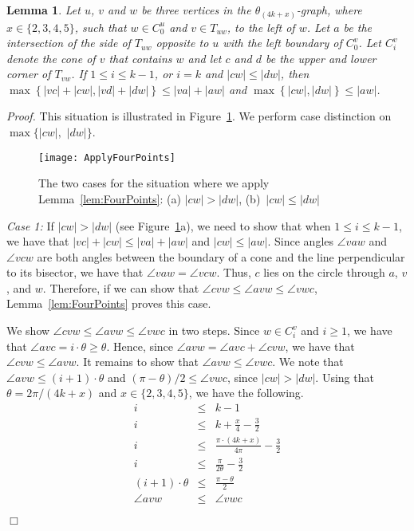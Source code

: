 \documentclass[12pt]{article}
\newtheorem{lem}[defin]{Lemma}
\newenvironment{lemma}{\begin{lem} \sl}{\end{lem}}
\newenvironment{proof}{\emph{Proof.}}{\hfill $\Box$\\}
\newcommand{\graph}[1]{\ensuremath{\theta_{(4 k + #1)}}-graph\xspace}
\newcommand{\canon}[2]{\ensuremath{T_{#1 #2}}}
\begin{document}
\begin{lemma}
  \label{lem:ApplyFourPoints} 
  Let $u$, $v$ and $w$ be three vertices in the \graph{x}, where $x \in \{2, 3, 4, 5\}$, such that $w \in C_0^u$ and $v \in \canon{u}{w}$, to the left of $w$. Let $a$ be the intersection of the side of $\canon{u}{w}$ opposite to $u$ with the left boundary of $C_0^v$. Let $C_i^v$ denote the cone of $v$ that contains $w$ and let $c$ and $d$ be the upper and lower corner of $\canon{v}{w}$. If $1 \leq i \leq k-1$, or $i = k$ and $|c w| \leq |d w|$, then $\max \left\{|v c| + |c w|, |v d| + |d w|\right\} \leq |v a| + |a w|$ and $\max \left\{|c w|, |d w|\right\} \leq |a w|$.
\end{lemma}
\begin{proof}
  This situation is illustrated in Figure~\ref{fig:ApplyFourPoints}. We perform case distinction on $\max \{|c w|,$ $|d w|\}$. 

  \begin{figure}[ht]
    \begin{center}
      \texttt{[image: ApplyFourPoints]}
    \end{center}
    \caption{The two cases for the situation where we apply Lemma~\ref{lem:FourPoints}: (a) $|c w| > |d w|$, \mbox{(b) $|c w| \leq |d w|$}}
    \label{fig:ApplyFourPoints}
  \end{figure}

  \textit{Case 1:} If $|c w| > |d w|$ (see Figure~\ref{fig:ApplyFourPoints}a), we need to show that when $1 \leq i \leq k-1$, we have that $|v c| + |c w| \leq |v a| + |a w|$ and $|c w| \leq |a w|$. Since angles $\angle vaw$ and $\angle vcw$ are both angles between the boundary of a cone and the line perpendicular to its bisector, we have that $\angle vaw = \angle vcw$. Thus, $c$ lies on the circle through $a$, $v$, and $w$. Therefore, if we can show that $\angle cvw \leq \angle avw \leq \angle vwc$, Lemma~\ref{lem:FourPoints} proves this case. 

  We show $\angle cvw \leq \angle avw \leq \angle vwc$ in two steps. Since $w \in C_i^v$ and $i \geq 1$, we have that $\angle avc = i \cdot \theta \geq \theta$. Hence, since $\angle avw = \angle avc + \angle cvw$, we have that $\angle cvw \leq \angle avw$. It remains to show that $\angle avw \leq \angle vwc$. We note that $\angle avw \leq (i + 1) \cdot \theta$ and $(\pi - \theta)/2 \leq \angle vwc$, since $|c w| > |d w|$. Using that $\theta = 2 \pi / (4 k + x)$ and $x \in \{2, 3, 4, 5\}$, we have the following. 
  \begin{eqnarray*}
    i &\leq& k - 1 \\
    i &\leq& k + \frac{x}{4} - \frac{3}{2} \\
    i &\leq& \frac{\pi \cdot (4 k + x)}{4 \pi} - \frac{3}{2} \\
    i &\leq& \frac{\pi}{2 \theta} - \frac{3}{2} \\
    (i + 1) \cdot \theta &\leq& \frac{\pi - \theta}{2} \\
    \angle avw &\leq& \angle vwc 
  \end{eqnarray*}


\end{proof}
\end{document}
